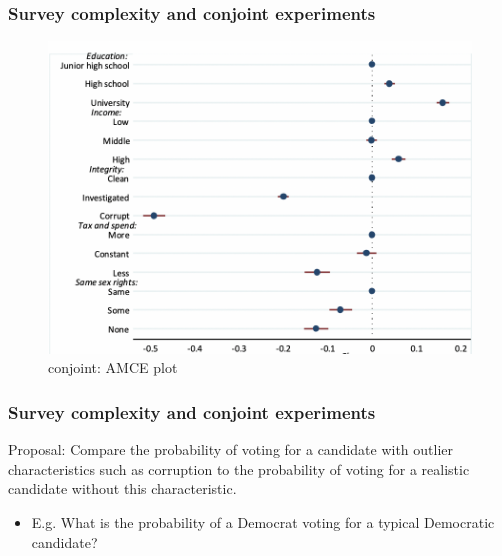 \documentclass[usenames,dvipsnames]{beamer}
\begin{document}
\begin{frame}
\frametitle{Survey complexity and conjoint experiments}

\begin{figure}[!hb]
\hspace*{-11mm}
\includegraphics[scale = 0.6]{fz_conjoint.png}
\vspace{0.2cm}
\caption{\citet{franchino2015voting} conjoint: AMCE plot}
\small
\vspace{-0.3cm}
\label{fig: fz_amce}
\end{figure}

\end{frame}

\begin{frame}
\frametitle{Survey complexity and conjoint experiments}
\textcolor{Cerulean}{Proposal}: Compare the probability of voting for a candidate with outlier characteristics such as corruption to the probability of voting for a realistic candidate without this characteristic.
\begin{itemize}
\item E.g. What is the probability of a Democrat voting for a typical Democratic candidate?
\end{itemize}

\end{frame}
\end{document}
